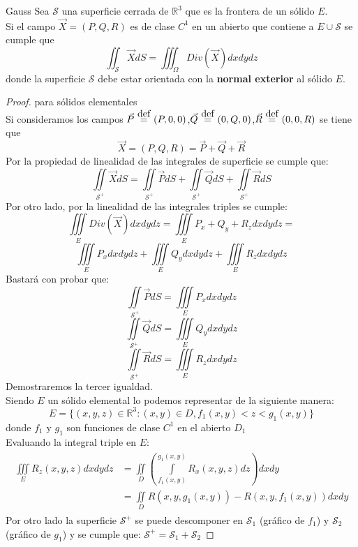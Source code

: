 \documentclass{report}
\newcommand\defeq{\stackrel{\mathclap{\normalfont\mbox{def}}}{~=~}}
\newcommand\reals{\mathds{R}}
\begin{document}
\begin{teobox}{Gauss}
	Sea $\mathcal{S}$ una superficie cerrada de $\reals^3$ que es la frontera de un sólido $E$. \\
	Si el campo $\vec{X} = (P,Q,R)$ es de clase $C^1$ en un abierto que contiene a $E \cup \mathcal{S}$ se cumple que
	\begin{equation}
		\iint_{\mathcal{S}}{\vec{X}dS} =
		\iiint_{\Omega}{Div(\vec{X})dxdydz}
		\label{eq:teo_gauss}
	\end{equation}
	donde la superficie $\mathcal{S}$ debe estar orientada con la \textbf{normal exterior} al sólido $E$.
\end{teobox}
\begin{proof} para sólidos elementales\\
Si consideramos los campos $\vec{P}\defeq (P,0,0)$,$\vec{Q}\defeq (0,Q,0)$,$\vec{R}\defeq (0,0,R)$ se tiene que
\[
	\vec{X} = (P,Q,R) = \vec{P} + \vec{Q} + \vec{R}
\]
Por la propiedad de linealidad de las integrales de superficie se cumple que:
\[
	\iint\limits_{\mathcal{S}^+}{\vec{X}dS} =
	\iint\limits_{\mathcal{S}^+}{\vec{P}dS} +
	\iint\limits_{\mathcal{S}^+}{\vec{Q}dS} +
	\iint\limits_{\mathcal{S}^+}{\vec{R}dS}
\]
Por otro lado, por la linealidad de las integrales triples se cumple:
\[
	\iiint\limits_E{Div(\vec{X})dxdydz} =
	\iiint\limits_E{P_x + Q_y + R_z dxdydz} = 
\]
\[
	\iiint\limits_E{P_x dxdydz} + 
	\iiint\limits_E{Q_y dxdydz} + 
	\iiint\limits_E{R_z dxdydz}
\]
Bastará con probar que:
\[
	\iint\limits_{\mathcal{S}^+}{\vec{P}dS} =
	\iiint\limits_E{P_x dxdydz}
\]
\[
	\iint\limits_{\mathcal{S}^+}{\vec{Q}dS} =
	\iiint\limits_E{Q_y dxdydz}
\]
\[
	\iint\limits_{\mathcal{S}^+}{\vec{R}dS} =
	\iiint\limits_E{R_z dxdydz}
\]
Demostraremos la tercer igualdad. \\ 
Siendo $E$ un sólido elemental lo podemos representar de la siguiente manera: 
\[
	E = \{ (x,y,z)\in \reals^3: (x,y)\in D, f_1(x,y)< z < g_1(x,y)\}
\]
donde $f_1$ y $g_1$ son funciones de clase $C^1$ en el abierto $D_1$ \\ 
Evaluando la integral triple en $E$:
\begin{gather*}
	\begin{aligned}
		\iiint\limits_E{R_z(x,y,z)dxdydz} & = \iint\limits_D{\left( \int\limits_{f_1(x,y)}^{g_1(x,y)}{R_x(x,y,z)dz}\right)dxdy} \\ 
										  & = \iint\limits_D{R(x,y,g_1(x,y))-R(x,y,f_1(x,y))dxdy}
	\end{aligned}
\end{gather*}
Por otro lado la superficie $\mathcal{S}^+$ se puede descomponer en $\mathcal{S}_1$ (gráfico de $f_1$) y $\mathcal{S}_2$ (gráfico de $g_1$) y se cumple que: $\mathcal{S}^+ = \mathcal{S}_1 + \mathcal{S}_2$

\end{proof}
\end{document}
